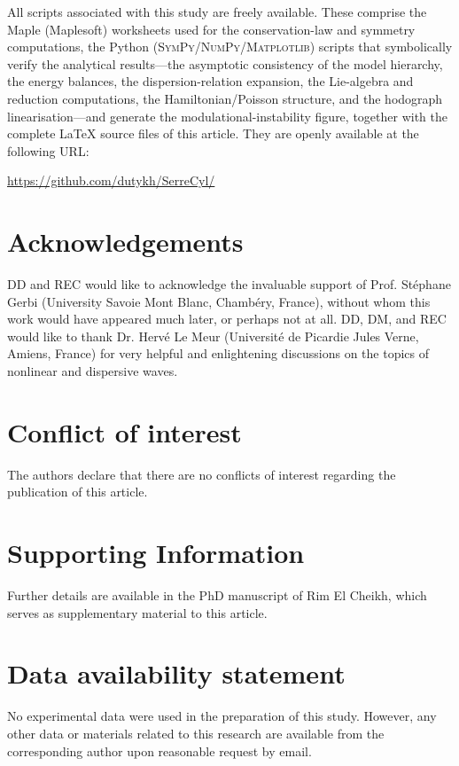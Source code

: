 \documentclass[alpha-refs, 12pt]{wiley-article}
\begin{document}
All scripts associated with this study are freely available. These comprise the Maple (Maplesoft\texttrademark) worksheets used for the conservation-law and symmetry computations, the Python (\textsc{SymPy}/\textsc{NumPy}/\textsc{Matplotlib}) scripts that symbolically verify the analytical results---the asymptotic consistency of the model hierarchy, the energy balances, the dispersion-relation expansion, the Lie-algebra and reduction computations, the Hamiltonian/Poisson structure, and the hodograph linearisation---and generate the modulational-instability figure, together with the complete LaTeX source files of this article. They are openly available at the following URL:

\url{https://github.com/dutykh/SerreCyl/}

\section*{Acknowledgements}

DD and REC would like to acknowledge the invaluable support of Prof. St\'ephane Gerbi (University Savoie Mont Blanc, Chamb\'ery, France), without whom this work would have appeared much later, or perhaps not at all. DD, DM, and REC would like to thank Dr. Herv\'e Le Meur (Universit\'e de Picardie Jules Verne, Amiens, France) for very helpful and enlightening discussions on the topics of nonlinear and dispersive waves.

\section*{Conflict of interest}

The authors declare that there are no conflicts of interest regarding the publication of this article.

\section*{Supporting Information}

Further details are available in the PhD manuscript of Rim El Cheikh, which serves as supplementary material to this article.

\section*{Data availability statement}

No experimental data were used in the preparation of this study. However, any other data or materials related to this research are available from the corresponding author upon reasonable request by email.
\end{document}
